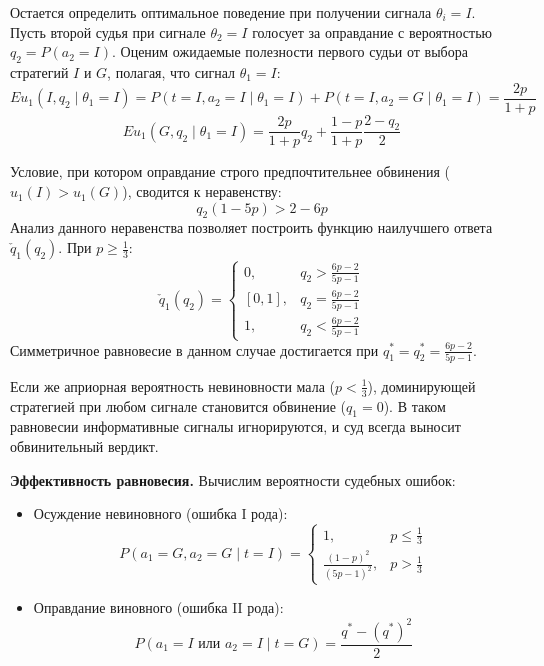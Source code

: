 Остается определить оптимальное поведение при получении сигнала $\theta_i = I$. Пусть второй судья при сигнале $\theta_2 = I$ голосует за оправдание с вероятностью $q_2 = P(a_2 = I)$. Оценим ожидаемые полезности первого судьи от выбора стратегий $I$ и $G$, полагая, что сигнал $\theta_1 = I$:
\begin{equation}
Eu_1(I, q_2 \mid \theta_1 = I) = P(t = I, a_2 = I \mid \theta_1 = I) + P(t = I, a_2 = G \mid \theta_1 = I) = \frac{2p}{1 + p}
\end{equation}
\begin{equation}
Eu_1(G, q_2 \mid \theta_1 = I) = \frac{2p}{1 + p} q_2 + \frac{1 - p}{1 + p} \frac{2 - q_2}{2}
\end{equation}

Условие, при котором оправдание строго предпочтительнее обвинения ($u_1(I) > u_1(G)$), сводится к неравенству:
\begin{equation}
q_2(1 - 5p) > 2 - 6p
\end{equation}
Анализ данного неравенства позволяет построить функцию наилучшего ответа $\check{q}_1(q_2)$. При $p \ge \frac{1}{3}$:
\begin{equation}
\check{q}_1(q_2) = 
\begin{cases}
0, & q_2 > \frac{6p - 2}{5p - 1} \\
[0, 1], & q_2 = \frac{6p - 2}{5p - 1} \\
1, & q_2 < \frac{6p - 2}{5p - 1}
\end{cases}
\end{equation}
Симметричное равновесие в данном случае достигается при $q_1^* = q_2^* = \frac{6p - 2}{5p - 1}$. 

Если же априорная вероятность невиновности мала ($p < \frac{1}{3}$), доминирующей стратегией при любом сигнале становится обвинение ($q_1 = 0$). В таком равновесии информативные сигналы игнорируются, и суд всегда выносит обвинительный вердикт.

\textbf{Эффективность равновесия.} Вычислим вероятности судебных ошибок:
\begin{itemize}
    \item Осуждение невиновного (ошибка I рода):
    \begin{equation}
    P(a_1 = G, a_2 = G \mid t = I) = 
    \begin{cases}
    1, & p \le \frac{1}{3} \\
    \frac{(1-p)^2}{(5p-1)^2}, & p > \frac{1}{3}
    \end{cases}
    \end{equation}
    \item Оправдание виновного (ошибка II рода):
    \begin{equation}
    P(a_1 = I \text{ или } a_2 = I \mid t = G) = \frac{q^* - (q^*)^2}{2}
    \end{equation}
\end{itemize}
